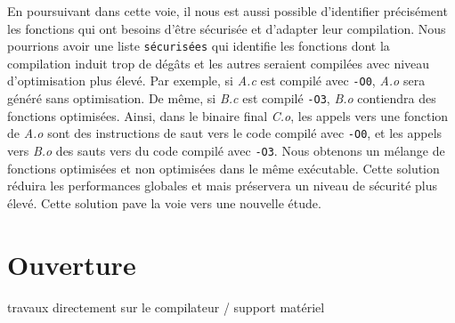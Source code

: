 En poursuivant dans cette voie, il nous est aussi possible d'identifier précisément les fonctions qui ont besoins d'être sécurisée et d'adapter leur compilation. Nous pourrions avoir une liste \texttt{sécurisées} qui identifie les fonctions dont la compilation induit trop de dégâts et les autres seraient compilées avec niveau d'optimisation plus élevé. Par exemple, si \textit{A.c} est compilé avec \texttt{-O0}, \textit{A.o} sera généré sans optimisation. De même, si \textit{B.c} est compilé \texttt{-O3}, \textit{B.o} contiendra des fonctions optimisées. Ainsi, dans le binaire final \textit{C.o}, les appels vers une fonction de \textit{A.o} sont des instructions de saut vers le code compilé avec \texttt{-O0}, et les appels vers \textit{B.o} des sauts vers du code compilé avec \texttt{-O3}. Nous obtenons un mélange de fonctions optimisées et non optimisées dans le même exécutable. Cette solution réduira les performances globales et mais préservera un niveau de sécurité plus élevé. Cette solution pave la voie vers une nouvelle étude.\medbreak




\section*{Ouverture}




travaux directement sur le compilateur / support matériel